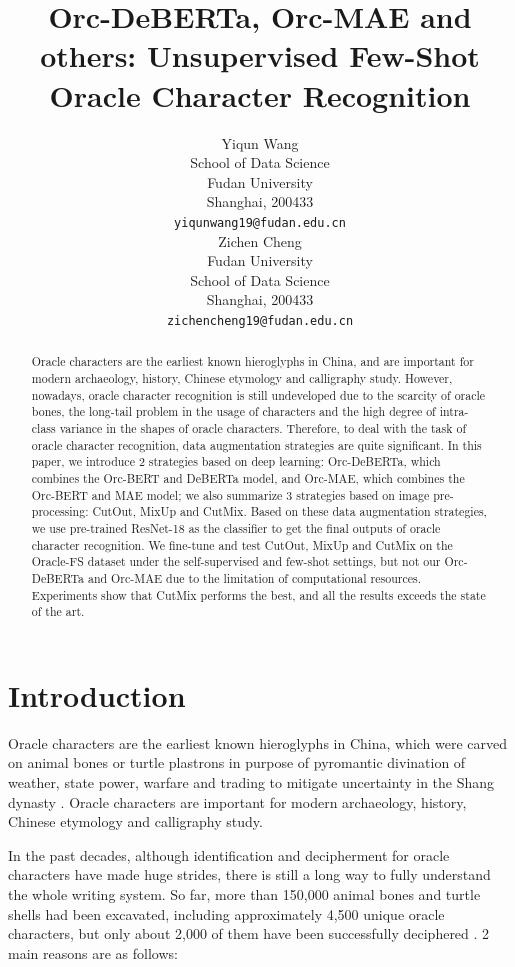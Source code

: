 \documentclass{article}
\title{Orc-DeBERTa, Orc-MAE and others: Unsupervised Few-Shot Oracle Character Recognition}
\author{
  Yiqun Wang \\
  School of Data Science \\
  Fudan University \\
  Shanghai, 200433 \\
  \texttt{yiqunwang19@fudan.edu.cn} \\
  \And
  Zichen Cheng \\
  Fudan University \\
  School of Data Science \\
  Shanghai, 200433 \\
  \texttt{zichencheng19@fudan.edu.cn} \\
}
\begin{document}
\maketitle

\begin{abstract}
Oracle characters are the earliest known hieroglyphs in China, and are important for modern archaeology, history, Chinese etymology and calligraphy study. However, nowadays, oracle character recognition is still undeveloped due to the scarcity of oracle bones, the long-tail problem in the usage of characters and the high degree of intra-class variance in the shapes of oracle characters.
Therefore, to deal with the task of oracle character recognition, data augmentation strategies are quite significant. In this paper, we introduce 2 strategies based on deep learning: Orc-DeBERTa, which combines the Orc-BERT and DeBERTa model, and Orc-MAE, which combines the Orc-BERT and MAE model; we also summarize 3 strategies based on image pre-processing: CutOut, MixUp and CutMix. Based on these data augmentation strategies, we use pre-trained ResNet-18 as the classifier to get the final outputs of oracle character recognition.
We fine-tune and test CutOut, MixUp and CutMix on the Oracle-FS dataset under the self-supervised and few-shot settings, but not our Orc-DeBERTa and Orc-MAE due to the limitation of computational resources. Experiments show that CutMix performs the best, and all the results exceeds the state of the art.
\end{abstract}

\section{Introduction}

Oracle characters are the earliest known hieroglyphs in China, which were carved on animal bones or turtle plastrons in purpose of pyromantic divination of weather, state power, warfare and trading to mitigate uncertainty in the Shang dynasty \citep{Oracle}. Oracle characters are important for modern archaeology, history, Chinese etymology and calligraphy study. \citep{Hierachical, Neighbor}

In the past decades, although identification and decipherment for oracle characters have made huge strides, there is still a long way to fully understand the whole writing system. 
So far, more than 150,000 animal bones and turtle shells had been excavated, including approximately 4,500 unique oracle characters, but only about 2,000 of them have been successfully deciphered \citep{OBC306}.
2 main reasons are as follows:
\end{document}
